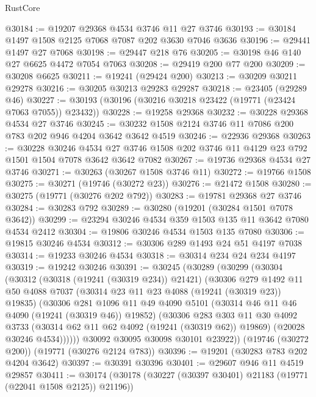 \begin{lexlean}{RustCore}
\begin{coremodule}
@30184 := @19207 @29368 @4534 @3746 @11 @27 @3746
@30193 := @30184 @1497 @1508 @2125 @7068 @7087 @202 @3630 @7046 @3636
@30196 := @29441 @1497 @27 @7068
@30198 := @29447 @218 @76
@30205 := @30198 @46 @140 @27 @6625 @4472 @7054 @7063
@30208 := @29419 @200 @77 @200
@30209 := @30208 @6625
@30211 := @19241 (@29424 @200)
@30213 := @30209 @30211 @29278
@30216 := @30205 @30213 @29283 @29287
@30218 := @23405 (@29289 @46)
@30227 := @30193 (@30196 (@30216 @30218 @23422 (@19771 (@23424 @7063 @7055)) @23432))
@30228 := @19258 @29368
@30232 := @30228 @29368 @4534 @27 @3746
@30245 := @30232 @1508 @2124 @3746 @11 @7086 @200 @783 @202 @946 @4204 @3642 @3642 @4519
@30246 := @22936 @29368
@30263 := @30228
    @30246
    @4534
    @27
    @3746
    @1508
    @202
    @3746
    @11
    @4129
    @23
    @792
    @1501
    @1504
    @7078
    @3642
    @3642
    @7082
@30267 := @19736 @29368 @4534 @27 @3746
@30271 := @30263 (@30267 @1508 @3746 @11)
@30272 := @19766 @1508
@30275 := @30271 (@19746 (@30272 @23))
@30276 := @21472 @1508
@30280 := @30275 (@19771 (@30276 @202 @792))
@30283 := @19781 @29368 @27 @3746
@30284 := @30283 @792
@30289 := @30280 (@19201 (@30284 @1501 @7078 @3642))
@30299 := @23294 @30246 @4534 @359 @1503 @135 @11 @3642 @7080 @4534 @2412
@30304 := @19806 @30246 @4534 @1503 @135 @7080
@30306 := @19815 @30246 @4534
@30312 := @30306 @289 @1493 @24 @51 @4197 @7038
@30314 := @19233 @30246 @4534
@30318 := @30314 @234 @24 @234 @4197
@30319 := @19242 @30246
@30391 := @30245
    (@30289
      (@30299
        (@30304
          (@30312
            (@30318 (@19241 (@30319 @234)) @21421)
            (@30306
              @279
              @1492
              @11
              @50
              @4088
              @7037
              (@30314 @23 @11 @23 @4088 (@19241 (@30319 @23)) @19835)
              (@30306
                @281
                @1096
                @11
                @49
                @4090
                @5101
                (@30314 @46 @11 @46 @4090 (@19241 (@30319 @46)) @19852)
                (@30306
                  @283
                  @303
                  @11
                  @30
                  @4092
                  @3733
                  (@30314 @62 @11 @62 @4092 (@19241 (@30319 @62)) @19869)
                  (@20028 @30246 @4534))))))
        @30092
        @30095
        @30098
        @30101
        @23922))
    (@19746 (@30272 @200))
    (@19771 (@30276 @2124 @783))
@30396 := @19201 (@30283 @783 @202 @4204 @3642)
@30397 := @30391 @30396
@30401 := @29607 @946 @11 @4519 @29857
@30411 := @30174 (@30178 (@30227 (@30397 @30401) @21183 (@19771 (@22041 @1508 @2125)) @21196))

\end{coremodule}
\end{lexlean}
